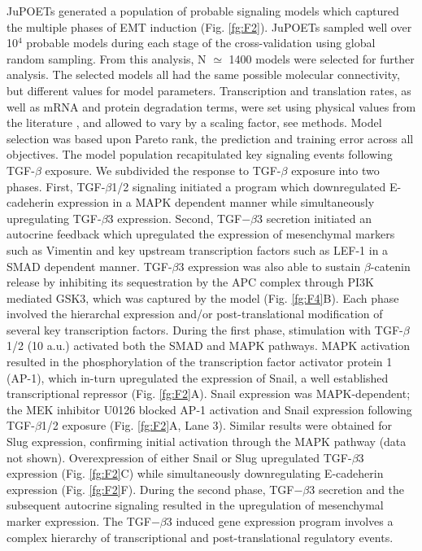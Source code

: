 \documentclass[12pt]{article}
\begin{document}
JuPOETs generated a population of probable signaling models which captured the multiple phases of EMT induction (Fig. \ref{fg:F2}).
JuPOETs sampled well over 10$^4$ probable models during each stage of the cross-validation using global random sampling.
From this analysis, N $\simeq$ 1400 models were selected for further analysis.
The selected models all had the same possible molecular connectivity, but different values for model parameters.
Transcription and translation rates, as well as mRNA and protein degradation terms, were set using physical values from the literature \citep{Milo:2010aa},
and allowed to vary by a scaling factor, see methods.
Model selection was based upon Pareto rank, the prediction and training error across all objectives.
The model population recapitulated key signaling events following TGF-$\beta$ exposure.
We subdivided the response to TGF-$\beta$ exposure into two phases.
First, TGF-$\beta$1/2 signaling initiated a program which downregulated E-cadeherin expression in a MAPK dependent manner while
simultaneously upregulating TGF-$\beta$3 expression. Second, TGF$-\beta$3 secretion initiated an autocrine feedback which upregulated the expression of
mesenchymal markers such as Vimentin and key upstream transcription factors such as LEF-1 in a SMAD dependent manner.
TGF-$\beta$3 expression was also able to sustain $\beta$-catenin release by inhibiting its sequestration by the APC complex through PI3K mediated GSK3,
which was captured by the model (Fig. \ref{fg:F4}B).
Each phase involved the hierarchal expression and/or post-translational modification of several key transcription factors.
During the first phase, stimulation with TGF-$\beta$1/2 (10 a.u.) activated both the SMAD and MAPK pathways.
MAPK activation resulted in the phosphorylation of the transcription factor activator protein 1 (AP-1), which in-turn upregulated the expression of Snail, a well established transcriptional repressor (Fig. \ref{fg:F2}A).
Snail expression was MAPK-dependent; the MEK inhibitor U0126 blocked AP-1 activation and Snail expression following TGF-$\beta$1/2 exposure (Fig. \ref{fg:F2}A, Lane 3).
Similar results were obtained for Slug expression, confirming initial activation through the MAPK pathway (data not shown).
Overexpression of either Snail or Slug upregulated TGF-$\beta$3 expression (Fig. \ref{fg:F2}C) while simultaneously downregulating E-cadeherin expression (Fig. \ref{fg:F2}F).
During the second phase, TGF$-\beta$3 secretion and the subsequent autocrine signaling resulted in the upregulation of mesenchymal marker expression.
The TGF$-\beta$3 induced gene expression program involves a complex hierarchy of transcriptional and post-translational regulatory events.
\end{document}
